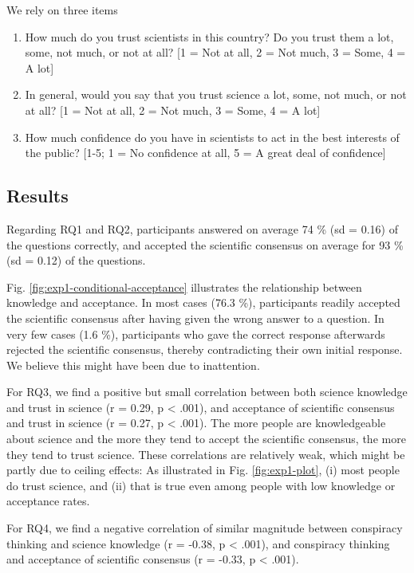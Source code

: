\documentclass[
  doc,floatsintext]{apa6}
\begin{document}
We rely on three items

\begin{enumerate}
\def\labelenumi{\arabic{enumi}.}
\item
  How much do you trust scientists in this country? Do you trust them a lot, some, not much, or not at all? {[}1 = Not at all, 2 = Not much, 3 = Some, 4 = A lot{]}
\item
  In general, would you say that you trust science a lot, some, not much, or not at all? {[}1 = Not at all, 2 = Not much, 3 = Some, 4 = A lot{]}
\item
  How much confidence do you have in scientists to act in the best interests of the public? {[}1-5; 1 = No confidence at all, 5 = A great deal of confidence{]}
\end{enumerate}

\subsection{Results}\label{results-1}

Regarding RQ1 and RQ2, participants answered on average 74 \% (sd = 0.16) of the questions correctly, and accepted the scientific consensus on average for 93 \% (sd = 0.12) of the questions.

Fig. \ref{fig:exp1-conditional-acceptance} illustrates the relationship between knowledge and acceptance. In most cases (76.3 \%), participants readily accepted the scientific consensus after having given the wrong answer to a question. In very few cases (1.6 \%), participants who gave the correct response afterwards rejected the scientific consensus, thereby contradicting their own initial response. We believe this might have been due to inattention.

For RQ3, we find a positive but small correlation between both science knowledge and trust in science (r = 0.29, p \textless{} .001), and acceptance of scientific consensus and trust in science (r = 0.27, p \textless{} .001). The more people are knowledgeable about science and the more they tend to accept the scientific consensus, the more they tend to trust science. These correlations are relatively weak, which might be partly due to ceiling effects: As illustrated in Fig. \ref{fig:exp1-plot}, (i) most people do trust science, and (ii) that is true even among people with low knowledge or acceptance rates.

For RQ4, we find a negative correlation of similar magnitude between conspiracy thinking and science knowledge (r = -0.38, p \textless{} .001), and conspiracy thinking and acceptance of scientific consensus (r = -0.33, p \textless{} .001).
\end{document}
